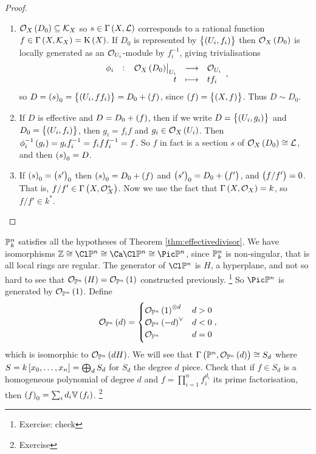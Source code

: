 \begin{proof}
\hfill
\begin{enumerate}
\item $ \OOO_X\br{D_0} \subseteq \KKK_X $ so $ s \in \Gamma\br{X, \LLL} $ corresponds to a rational function $ f \in \Gamma\br{X, \KKK_X} = \K\br{X} $. If $ D_0 $ is represented by $ \cbr{\br{U_i, f_i}} $ then $ \OOO_X\br{D_0} $ is locally generated as an $ \mathcal{O}_{U_i} $-module by $ f_i^{-1} $, giving trivialisations
$$ \function[\phi_i]{\eval{\OOO_X\br{D_0}}_{U_i}}{\OOO_{U_i}}{t}{tf_i}, $$
so $ D = \br{s}_0 = \cbr{\br{U_i, ff_i}} = D_0 + \br{f} $, since $ \br{f} = \cbr{\br{X, f}} $. Thus $ D \sim D_0 $.
\item If $ D $ is effective and $ D = D_0 + \br{f} $, then if we write $ D = \cbr{\br{U_i, g_i}} $ and $ D_0 = \cbr{\br{U_i, f_i}} $, then $ g_i = f_if $ and $ g_i \in \OOO_X\br{U_i} $. Then $ \phi_i^{-1}\br{g_i} = g_if_i^{-1} = f_iff_i^{-1} = f $. So $ f $ in fact is a section $ s $ of $ \OOO_X\br{D_0} \cong \LLL $, and then $ \br{s}_0 = D $.
\item If $ \br{s}_0 = \br{s'}_0 $ then $ \br{s}_0 = D_0 + \br{f} $ and $ \br{s'}_0 = D_0 + \br{f'} $, and $ \br{f / f'} = 0 $. That is, $ f / f' \in \Gamma\br{X, \OOO_X^*} $. Now we use the fact that $ \Gamma\br{X, \OOO_X} = k $, so $ f / f' \in k^* $.
\end{enumerate}
\end{proof}

\pagebreak

\begin{example*}
$ \mathbb{P}_k^n $ satisfies all the hypotheses of Theorem \ref{thm:effectivedivisor}. We have isomorphisms $ \ZZ \cong \Cl \PP^n \cong \Ca\Cl \PP^n \cong \Pic \PP^n $, since $ \mathbb{P}_k^n $ is non-singular, that is all local rings are regular. The generator of $ \Cl \PP^n $ is $ H $, a hyperplane, and not so hard to see that $ \OOO_{\PP^n}\br{H} = \OOO_{\PP^n}\br{1} $ constructed previously. \footnote{Exercise: check} So $ \Pic \PP^n $ is generated by $ \OOO_{\PP^n}\br{1} $. Define
$$ \OOO_{\PP^n}\br{d} =
\begin{cases}
\OOO_{\PP^n}\br{1}^{\otimes d} & d > 0 \\
\OOO_{\PP^n}\br{-d}^\vee & d < 0 \\
\OOO_{\PP^n} & d = 0
\end{cases},
$$
which is isomorphic to $ \OOO_{\PP^n}\br{dH} $. We will see that $ \Gamma\br{\PP^n, \OOO_{\PP^n}\br{d}} \cong S_d $ where $ S = k\sbr{x_0, \dots, x_n} = \bigoplus_d S_d $ for $ S_d $ the degree $ d $ piece. Check that if $ f \in S_d $ is a homogeneous polynomial of degree $ d $ and $ f = \prod_{i = 1}^n f_i^{d_i} $ its prime factorisation, then $ \br{f}_0 = \sum_i d_i\VV\br{f_i} $. \footnote{Exercise}
\end{example*}

